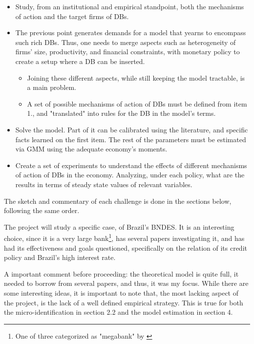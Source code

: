 \documentclass[12pt]{article}
\begin{document}
\begin{itemize}
    \item Study, from an institutional and empirical standpoint, both the mechanisms of action and the target firms of DBs.
    \item The previous point generates demands for a model that yearns to encompass such rich DBs. Thus, one needs to merge aspects such as heterogeneity of firms' size, productivity, and financial constraints, with monetary policy to create a setup where a DB can be inserted.
    \begin{itemize}
        \item Joining these different aspects, while still keeping the model tractable, is a main problem.
        \item A set of possible mechanisms of action of DBs must be defined from item 1., and "translated" into rules for the DB in the model's terms.
    \end{itemize}
    \item Solve the model. Part of it can be calibrated using the literature, and specific facts learned on the first item. The rest of the parameters must be estimated via GMM using the adequate economy's moments.
    \item Create a set of experiments to understand the effects of different mechanisms of action of DBs in the economy. Analyzing, under each policy, what are the results in terms of steady state values of relevant variables.
\end{itemize}

The sketch and commentary of each challenge is done in the sections below, following the same order.

The project will study a specific case, of Brazil's BNDES. It is an interesting choice, since it is a very large bank\footnote{One of three categorized as "megabank" by \cite{martinez_2012}}, has several papers investigating it, and has had its effectiveness and goals questioned, specifically on the relation of its credit policy and Brazil's high interest rate.

A important comment before proceeding: the theoretical model is quite full, it needed to borrow from several papers, and thus, it was my focus. While there are some interesting ideas, it is important to note that, the most lacking aspect of the project, is the lack of a well defined empirical strategy. This is true for both the micro-identification in section 2.2 and the model estimation in section 4.
\end{document}
